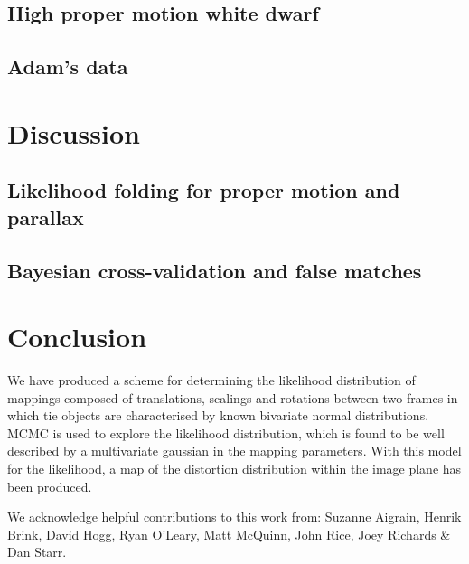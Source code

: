 \documentclass[manuscript]{aastex}
\begin{document}
\subsection{High proper motion white dwarf}

\subsection{Adam's data}

\section{Discussion}

\subsection{Likelihood folding for proper motion and parallax}

\subsection{Bayesian cross-validation and false matches}

\section{Conclusion}
We have produced a scheme for determining the likelihood distribution of mappings composed of translations, scalings and rotations between two frames in which tie objects are characterised by known bivariate normal distributions. MCMC is used to explore the likelihood distribution, which is found to be well described by a multivariate gaussian in the mapping parameters. With this model for the likelihood, a map of the distortion distribution within the image plane has been produced.

\acknowledgments

We acknowledge helpful contributions to this work from: Suzanne Aigrain, Henrik Brink, David Hogg, Ryan O'Leary, Matt McQuinn, John Rice, Joey Richards \& Dan Starr. 
\end{document}
